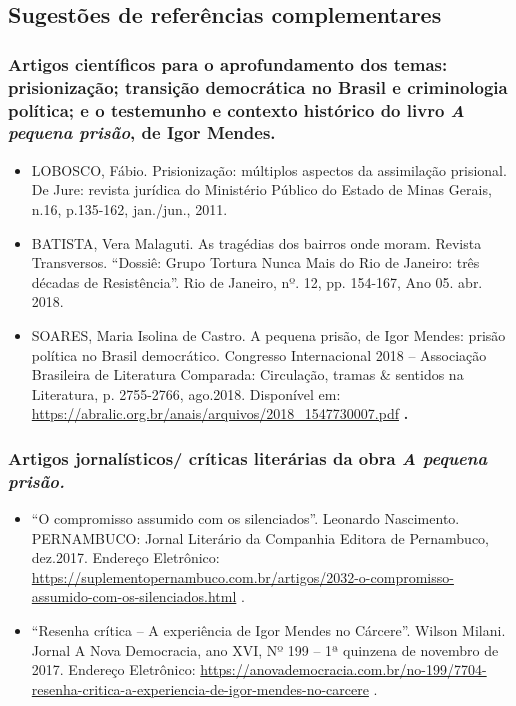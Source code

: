 \documentclass[11pt]{extarticle}
\begin{document}
\subsection{Sugestões de referências complementares}

\subsubsection{{Artigos científicos} para o aprofundamento dos temas:
prisionização; transição democrática no Brasil e criminologia política;
e o testemunho e contexto histórico do livro \emph{A pequena prisão}, de
Igor Mendes.}

\begin{itemize}
\item
  LOBOSCO, Fábio. Prisionização: múltiplos aspectos da assimilação
  prisional. De Jure: revista jurídica do Ministério Público do Estado
  de Minas Gerais, n.16, p.135-162, jan./jun., 2011.
\item
  BATISTA, Vera Malaguti. As tragédias dos bairros onde moram. Revista
  Transversos. ``Dossiê: Grupo Tortura Nunca Mais do Rio de Janeiro:
  três décadas de Resistência''. Rio de Janeiro, nº. 12, pp. 154-167,
  Ano 05. abr. 2018.
\item
  SOARES, Maria Isolina de Castro. A pequena prisão, de Igor Mendes:
  prisão política no Brasil democrático. Congresso Internacional 2018 --
  Associação Brasileira de Literatura Comparada: Circulação, tramas \&
  sentidos na Literatura, p. 2755-2766, ago.2018. Disponível em:
  \href{https://abralic.org.br/anais/arquivos/2018_1547730007.pdf}{{https://abralic.org.br/anais/arquivos/2018\_1547730007.pdf}}
  \textbf{.}
\end{itemize}


\subsubsection{{Artigos jornalísticos/ críticas literárias} da obra \emph{A
pequena prisão.}}

\begin{itemize}
\item
  ``O compromisso assumido com os silenciados''. Leonardo Nascimento.
  PERNAMBUCO: Jornal Literário da Companhia Editora de Pernambuco,
  dez.2017. Endereço Eletrônico:
  \href{https://suplementopernambuco.com.br/artigos/2032-o-compromisso-assumido-com-os-silenciados.html}{{https://suplementopernambuco.com.br/artigos/2032-o-compromisso-assumido-com-os-silenciados.html}}
  .
\item
  ``Resenha crítica -- A experiência de Igor Mendes no Cárcere''. Wilson
  Milani. Jornal A Nova Democracia, ano XVI, Nº 199 -- 1ª quinzena de
  novembro de 2017. Endereço Eletrônico:
  \href{https://anovademocracia.com.br/no-199/7704-resenha-critica-a-experiencia-de-igor-mendes-no-carcere}{{https://anovademocracia.com.br/no-199/7704-resenha-critica-a-experiencia-de-igor-mendes-no-carcere}}
  .
\end{itemize}
\end{document}
